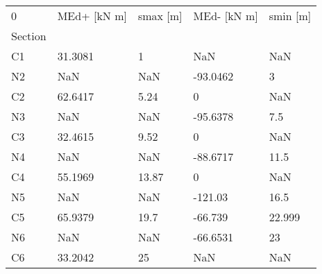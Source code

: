 \begin{tabular}{lllll}
\toprule
0 & MEd+ [kN m] & smax [m] & MEd- [kN m] & smin [m] \\
Section &             &          &             &          \\
\midrule
C1      &     31.3081 &        1 &         NaN &      NaN \\
N2      &         NaN &      NaN &    -93.0462 &        3 \\
C2      &     62.6417 &     5.24 &           0 &      NaN \\
N3      &         NaN &      NaN &    -95.6378 &      7.5 \\
C3      &     32.4615 &     9.52 &           0 &      NaN \\
N4      &         NaN &      NaN &    -88.6717 &     11.5 \\
C4      &     55.1969 &    13.87 &           0 &      NaN \\
N5      &         NaN &      NaN &     -121.03 &     16.5 \\
C5      &     65.9379 &     19.7 &     -66.739 &   22.999 \\
N6      &         NaN &      NaN &    -66.6531 &       23 \\
C6      &     33.2042 &       25 &         NaN &      NaN \\
\bottomrule
\end{tabular}
